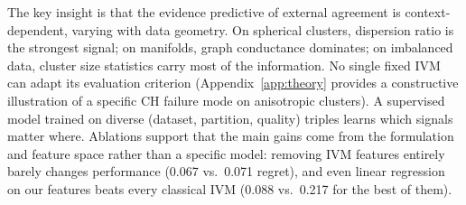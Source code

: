 \documentclass[10pt]{article} %
\begin{document}
The key insight is that the evidence predictive of external agreement is context-dependent, varying with data geometry. On spherical clusters, dispersion ratio is the strongest signal; on manifolds, graph conductance dominates; on imbalanced data, cluster size statistics carry most of the information. No single fixed IVM can adapt its evaluation criterion (Appendix~\ref{app:theory} provides a constructive illustration of a specific CH failure mode on anisotropic clusters). A supervised model trained on diverse (dataset, partition, quality) triples learns which signals matter where. Ablations support that the main gains come from the formulation and feature space rather than a specific model: removing IVM features entirely barely changes performance (0.067 vs.\ 0.071 regret), and even linear regression on our features beats every classical IVM (0.088 vs.\ 0.217 for the best of them).
\end{document}
